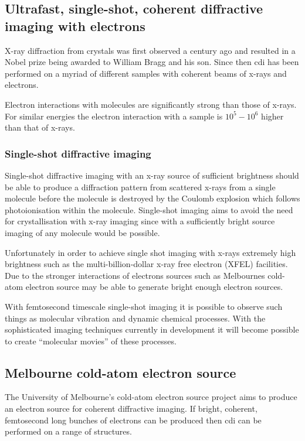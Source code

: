 \subsection{Ultrafast, single-shot, coherent diffractive imaging with electrons}
X-ray diffraction from crystals was first observed a century ago\cite{bragg_x-rays_1912} and resulted in a Nobel prize being awarded to William Bragg and his son. Since then \gls{cdi} has been performed on a myriad of different samples with coherent beams of x-rays and electrons.

Electron interactions with molecules are significantly strong than those of x-rays. For similar energies the electron interaction with a sample is $10^5-10^6$ higher than that of x-rays\cite{sciaini_femtosecond_2011}.

\subsubsection{Single-shot diffractive imaging}
Single-shot diffractive imaging with an x-ray source of sufficient brightness should be able to produce a diffraction pattern from scattered x-rays from a single molecule before the molecule is destroyed by the Coulomb explosion which follows photoionisation within the molecule\cite{henderson_potential_1995, neutze_potential_2000}. Single-shot imaging aims to avoid the need for crystallisation with x-ray imaging since with a sufficiently bright source imaging of any molecule would be possible.

Unfortunately in order to achieve single shot imaging with x-rays extremely high brightness such as the multi-billion-dollar x-ray free electron (XFEL) facilities. Due to the stronger interactions of electrons sources such as Melbournes cold-atom electron source may be able to generate bright enough electron sources.

With femtosecond timescale single-shot imaging it is possible to observe such things as molecular vibration and dynamic chemical processes\cite{zewail_4d_2006}. With the sophisticated imaging techniques currently in development it will become possible to create ``molecular movies''\cite{dwyer_femtosecond_2006} of these processes.

\subsection{Melbourne cold-atom electron source}
The University of Melbourne's cold-atom electron source project aims to produce an electron source for coherent diffractive imaging. If bright, coherent, femtosecond long bunches of electrons can be produced then \gls{cdi} can be performed on a range of structures.

